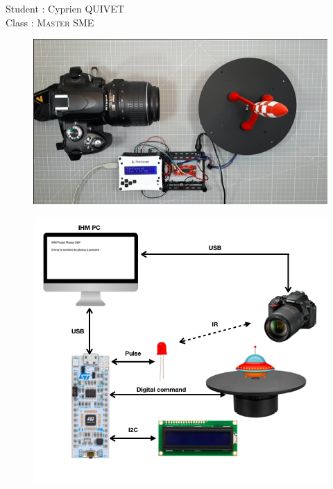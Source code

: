 \begin{titlepage}
  \Large
  Student : Cyprien \textsc{QUIVET}\\ %
   \Large
   Class :  \textsc{ Master SME}\\ %
  

  
  \begin{figure}[h]
    \centering
    \includegraphics[scale=0.4]{img/presentation.png}\\%
    \label{fig:LogoTachyssema}
  \end{figure}

  \begin{figure}[h]
    \centering
    \includegraphics[scale=0.5]{img/projet.png}\\%
    \label{fig:LogoTachyssema}
  \end{figure}

  
   
  
  \end{titlepage}